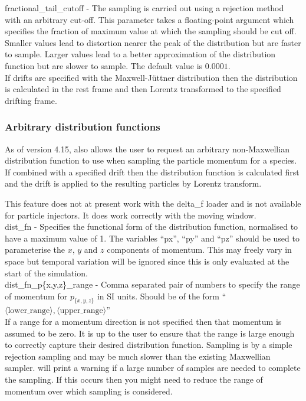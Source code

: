 {\emphtext fractional\_tail\_cutoff} - The sampling is carried out using a
  rejection method with an arbitrary cut-off. This parameter takes a
  floating-point argument which specifies the fraction of maximum value at
  which the sampling should be cut off. Smaller values lead to distortion
  nearer the peak of the distribution but are faster to sample. Larger values
  lead to a better approximation of the distribution function but are slower
  to sample. The default value is $0.0001$.\\

If drifts are specified with the Maxwell-J\"uttner distribution then the
distribution is calculated in the rest frame and then Lorentz transformed to
the specified drifting frame.

\subsubsection{Arbitrary distribution functions}
\label{sec:arbitrary_dist_fn}

As of version 4.15, \EPOCH also allows the user to request an arbitrary
non-Maxwellian distribution function to use when sampling the particle
momentum for a species. If combined with a specified drift then the
distribution function is calculated first and the drift is applied to the
resulting particles by Lorentz transform.

This feature does not at present work with the delta\_f loader and is not
available for particle injectors. It does work correctly with the moving
window.\\

{\emphtext dist\_fn} - Specifies the functional form of the distribution
  function, normalised to have a maximum value of 1. The variables
  ``px'', ``py'' and ``pz'' should be used to parameterise the $x$, $y$ and $z$
  components of momentum. This may freely vary in space but temporal variation
  will be ignored since this is only evaluated at the start of the simulation.\\

{\emphtext dist\_fn\_p\{x,y,z\}\_range} - Comma separated pair of numbers to
  specify the range of momentum for $p_{\{x,y,z\}}$ in SI units. Should be of
  the form
  ``$\langle\mbox{lower\_range}\rangle, \langle\mbox{upper\_range}\rangle$''\\

If a range for a momentum direction is not specified then that momentum is
assumed to be zero. It is up to the user to ensure that the range is large
enough to correctly capture their desired distribution function. Sampling is by
a simple rejection sampling and may be much slower than the existing Maxwellian
sampler. \EPOCH will print a warning if a large number of samples are needed to
complete the sampling. If this occurs then you might need to reduce the range
of momentum over which sampling is considered.

